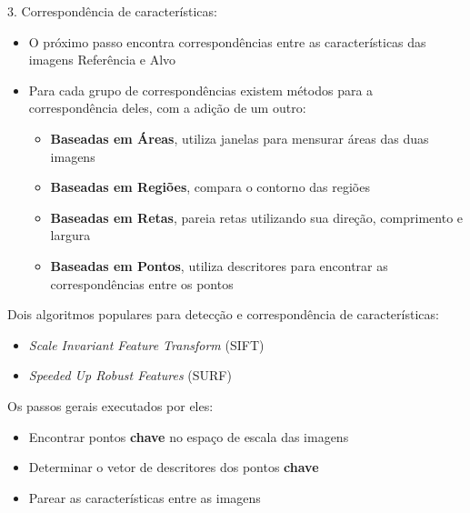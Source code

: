 \documentclass[t]{beamer}
\begin{document}
\begin{frame}
  3. Correspondência de características:
  \begin{itemize}
    \item O próximo passo encontra correspondências entre as características das imagens Referência e Alvo
    \item Para cada grupo de correspondências existem métodos para a correspondência deles, com a adição de um outro:
    \begin{itemize}
      \item \textbf{Baseadas em Áreas}, utiliza janelas para mensurar áreas das duas imagens
      \item \textbf{Baseadas em Regiões}, compara o contorno das regiões
      \item \textbf{Baseadas em Retas}, pareia retas utilizando sua direção, comprimento e largura
      \item \textbf{Baseadas em Pontos}, utiliza descritores para encontrar as correspondências entre os pontos
    \end{itemize}
  \end{itemize}
\end{frame}

\begin{frame} 
  Dois algoritmos populares para detecção e correspondência de características:
  \begin{itemize}
    \item \textit{Scale Invariant Feature Transform} (SIFT) \cite{lowe2004distinctive}
    \item \textit{Speeded Up Robust Features} (SURF) \cite{bay2008speeded}
  \end{itemize}
  Os passos gerais executados por eles:
  \begin{itemize}
      \item Encontrar pontos \textbf{chave} no espaço de escala das imagens
      \item Determinar o vetor de descritores dos pontos \textbf{chave}
      \item Parear as características entre as imagens
    \end{itemize}
\end{frame}
\end{document}
